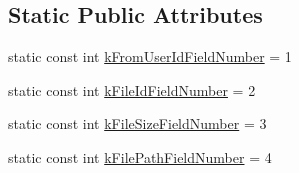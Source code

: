 \subsection*{Static Public Attributes}
\begin{DoxyCompactItemize}
\item 
static const int \hyperlink{class_i_m_1_1_base_define_1_1_server_offline_file_info_ac5c6331098e027f030f73cab0c4e329f}{k\+From\+User\+Id\+Field\+Number} = 1
\item 
static const int \hyperlink{class_i_m_1_1_base_define_1_1_server_offline_file_info_a1cec0ee48e5b43def9a4d32cf9035dbc}{k\+File\+Id\+Field\+Number} = 2
\item 
static const int \hyperlink{class_i_m_1_1_base_define_1_1_server_offline_file_info_a72d8acfefb16277fc600033b7f1b71ee}{k\+File\+Size\+Field\+Number} = 3
\item 
static const int \hyperlink{class_i_m_1_1_base_define_1_1_server_offline_file_info_ad233a24ba0def4b357d55d11d1f10006}{k\+File\+Path\+Field\+Number} = 4
\end{DoxyCompactItemize}
